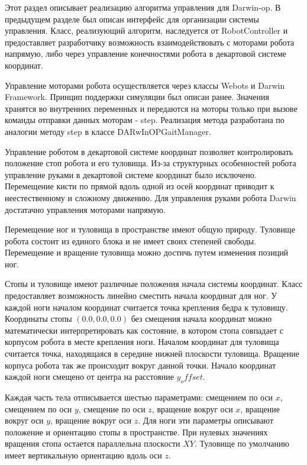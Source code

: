 Этот раздел описывает реализацию алгоритма управления для Darwin-op. В предыдущем разделе был описан интерфейс для организации системы управления. Класс, реализующий алгоритм, наследуется от RobotController и предоставляет разработчику возможность взаимодействовать с моторами робота напрямую, либо через управление конечностями робота в декартовой системе координат.

Управление моторами робота осуществляется через классы  Webots и Darwin Framework. Принцип поддержки симуляции был описан ранее. Значения хранятся во внутренних переменных и передаются на моторы только при вызове команды отправки данных моторам - step. Реализация метода разработана по аналогии методу step в классе DARwInOPGaitManager. 

Управление роботом в декартовой системе координат позволяет контролировать положение стоп робота и его туловища. Из-за структурных особенностей робота управление руками в декартовой системе координат было исключено. Перемещение кисти по прямой вдоль одной из осей координат приводит к неестественному и сложному движению. Для управления руками робота Darwin достатачно управления моторами напрямую.

Перемещение ног и туловища в пространстве имеют общую природу. Туловище робота состоит из единого блока и не имеет своих степеней свободы. Перемещение и вращение туловища можно достичь путем изменения позиций ног. 

Стопы и туловище имеют различные положения начала системы координат. Класс предоставляет возможность линейно сместить начала координат для ног. У каждой ноги началом координат считается точка крепления бедра к туловищу. Координаты стопы $(0.0, 0.0, 0.0)$ без смещения начала координат можно математически интерпретировать как состояние, в котором стопа совпадает с корпусом робота в месте крепления ноги. Началом координат для туловища считается точка, находящаяся в середине нижней плоскости туловища. Вращение корпуса робота так же происходит вокруг данной точки. Начало координат каждой ноги смещено от центра на расстояние $y_offset$.

Каждая часть тела отписывается шестью параметрами: смещением по оси $x$, смещением по оси $y$, смещение по оси $z$, вращение вокруг оси $x$, вращение вокруг оси $y$, вращение вокруг оси $z$. Для ноги эти параметры описывают положение и ориентацию стопы в пространстве. При нулевых значениях вращения стопа остается параллельна плоскости $XY$. Туловище по умолчанию имеет вертикальную ориентацию вдоль оси $z$.

